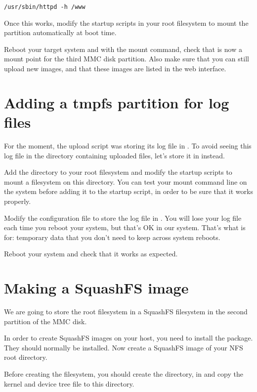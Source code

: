 \begin{verbatim}
/usr/sbin/httpd -h /www
\end{verbatim}

Once this works, modify the startup scripts in your root filesystem
to mount the partition automatically at boot time.

Reboot your target system and with the mount command, check that
 is now a mount point for the third MMC disk
partition. Also make sure that you can still upload new images, and
that these images are listed in the web interface.

\section{Adding a tmpfs partition for log files}

For the moment, the upload script was storing its log file in
. To avoid seeing this log file in
the directory containing uploaded files, let's store it in
 instead.

Add the  directory to your root filesystem and modify
the startup scripts to mount a  filesystem on this
directory. You can test your  mount command line on the
system before adding it to the startup script, in order to be sure
that it works properly.

Modify the  configuration file to store
the log file in . You will lose your log
file each time you reboot your system, but that's OK in our
system. That's what  is for: temporary data that you don't need
to keep across system reboots.

Reboot your system and check that it works as expected.

\section{Making a SquashFS image}

We are going to store the root filesystem in a SquashFS filesystem in
the second partition of the MMC disk.

In order to create SquashFS images on your host, you need to install
the  package. They should normally be installed.
Now create a SquashFS image of your NFS root directory.

Before creating the filesystem, you should create the  directory,
in  and copy the kernel and device tree file to this directory.

